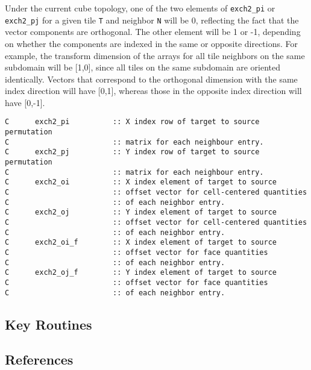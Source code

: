 Under the current cube topology, one of the two elements of
\texttt{exch2\_pi} or \texttt{exch2\_pj} for a given tile \texttt{T}
and neighbor \texttt{N} will be 0, reflecting the fact that the vector
components are orthogonal.  The other element will be 1 or -1,
depending on whether the components are indexed in the same or
opposite directions.  For example, the transform dimension of the
arrays for all tile neighbors on the same subdomain will be [1,0],
since all tiles on the same subdomain are oriented identically.
Vectors that correspond to the orthogonal dimension with the same
index direction will have [0,1], whereas those in the opposite index
direction will have [0,-1].


{\footnotesize
\begin{verbatim}
C      exch2_pi          :: X index row of target to source permutation 
C                        :: matrix for each neighbour entry.            
C      exch2_pj          :: Y index row of target to source permutation 
C                        :: matrix for each neighbour entry.            
C      exch2_oi          :: X index element of target to source 
C                        :: offset vector for cell-centered quantities  
C                        :: of each neighbor entry.                     
C      exch2_oj          :: Y index element of target to source 
C                        :: offset vector for cell-centered quantities  
C                        :: of each neighbor entry.                     
C      exch2_oi_f        :: X index element of target to source 
C                        :: offset vector for face quantities           
C                        :: of each neighbor entry.                     
C      exch2_oj_f        :: Y index element of target to source 
C                        :: offset vector for face quantities           
C                        :: of each neighbor entry.                     
\end{verbatim}
}



\subsection{Key Routines}



\subsection{References}

